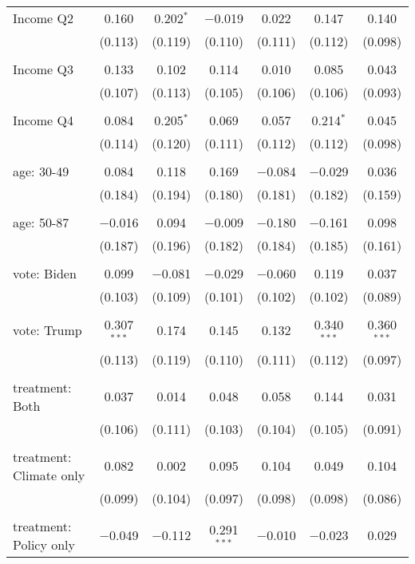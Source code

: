 \begin{tabular}{@{\extracolsep{5pt}}lcccccc}
 Income Q2 & 0.160 & 0.202$^{*}$ & $-$0.019 & 0.022 & 0.147 & 0.140 \\ 
  & (0.113) & (0.119) & (0.110) & (0.111) & (0.112) & (0.098) \\ 
  & & & & & & \\ 
 Income Q3 & 0.133 & 0.102 & 0.114 & 0.010 & 0.085 & 0.043 \\ 
  & (0.107) & (0.113) & (0.105) & (0.106) & (0.106) & (0.093) \\ 
  & & & & & & \\ 
 Income Q4 & 0.084 & 0.205$^{*}$ & 0.069 & 0.057 & 0.214$^{*}$ & 0.045 \\ 
  & (0.114) & (0.120) & (0.111) & (0.112) & (0.112) & (0.098) \\ 
  & & & & & & \\ 
 age: 30-49 & 0.084 & 0.118 & 0.169 & $-$0.084 & $-$0.029 & 0.036 \\ 
  & (0.184) & (0.194) & (0.180) & (0.181) & (0.182) & (0.159) \\ 
  & & & & & & \\ 
 age: 50-87 & $-$0.016 & 0.094 & $-$0.009 & $-$0.180 & $-$0.161 & 0.098 \\ 
  & (0.187) & (0.196) & (0.182) & (0.184) & (0.185) & (0.161) \\ 
  & & & & & & \\ 
 vote: Biden & 0.099 & $-$0.081 & $-$0.029 & $-$0.060 & 0.119 & 0.037 \\ 
  & (0.103) & (0.109) & (0.101) & (0.102) & (0.102) & (0.089) \\ 
  & & & & & & \\ 
 vote: Trump & 0.307$^{***}$ & 0.174 & 0.145 & 0.132 & 0.340$^{***}$ & 0.360$^{***}$ \\ 
  & (0.113) & (0.119) & (0.110) & (0.111) & (0.112) & (0.097) \\ 
  & & & & & & \\ 
 treatment: Both & 0.037 & 0.014 & 0.048 & 0.058 & 0.144 & 0.031 \\ 
  & (0.106) & (0.111) & (0.103) & (0.104) & (0.105) & (0.091) \\ 
  & & & & & & \\ 
 treatment: Climate only & 0.082 & 0.002 & 0.095 & 0.104 & 0.049 & 0.104 \\ 
  & (0.099) & (0.104) & (0.097) & (0.098) & (0.098) & (0.086) \\ 
  & & & & & & \\ 
 treatment: Policy only & $-$0.049 & $-$0.112 & 0.291$^{***}$ & $-$0.010 & $-$0.023 & 0.029 \\ 

\end{tabular}
